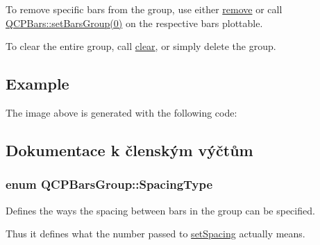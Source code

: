 To remove specific bars from the group, use either \hyperlink{classQCPBarsGroup_a215e28a5944f1159013a0e19169220e7}{remove} or call \hyperlink{classQCPBars_aedd1709061f0b307c47ddb45e172ef9a}{Q\+C\+P\+Bars\+:\+:set\+Bars\+Group(0)} on the respective bars plottable.

To clear the entire group, call \hyperlink{classQCPBarsGroup_a3ddf23928c6cd89530bd34ab7ba7b177}{clear}, or simply delete the group.\hypertarget{classQCPBarsGroup_qcpbarsgroup-example}{}\subsection{Example}\label{classQCPBarsGroup_qcpbarsgroup-example}
The image above is generated with the following code\+: 
\begin{DoxyCodeInclude}
\end{DoxyCodeInclude}


\subsection{Dokumentace k členským výčtům}
\hypertarget{classQCPBarsGroup_a4c0521120a97e60bbca37677a37075b6}{}
\subsubsection[{Spacing\+Type}]{\setlength{\rightskip}{0pt plus 5cm}enum {\bf Q\+C\+P\+Bars\+Group\+::\+Spacing\+Type}}\label{classQCPBarsGroup_a4c0521120a97e60bbca37677a37075b6}


Defines the ways the spacing between bars in the group can be specified. 

Thus it defines what the number passed to \hyperlink{classQCPBarsGroup_aa553d327479d72a0c3dafcc724a190e2}{set\+Spacing} actually means.

